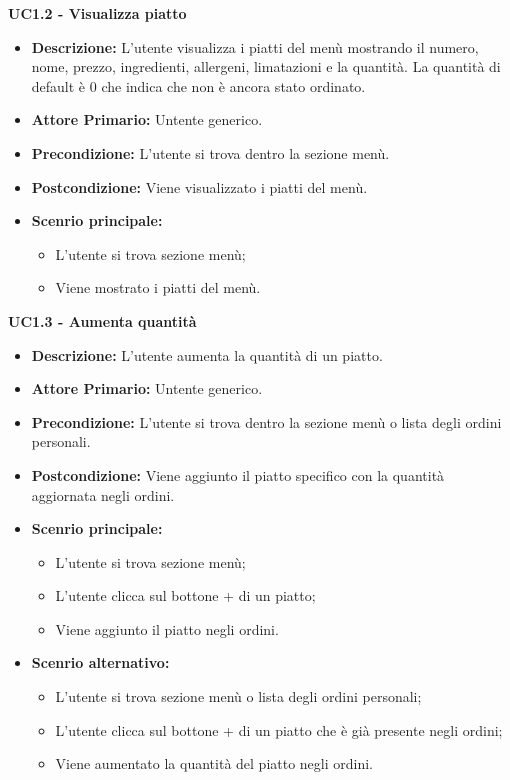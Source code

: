 \textbf{UC1.2 - Visualizza piatto}
\begin{itemize}
    \item \textbf{Descrizione:} L'utente visualizza i piatti del menù mostrando il numero, nome, prezzo, ingredienti, allergeni, limatazioni e la quantità. La quantità di default è 0 che indica che non è ancora stato ordinato.
    \item \textbf{Attore Primario:} Untente generico.
    \item \textbf{Precondizione:} L'utente si trova dentro la sezione menù.
    \item \textbf{Postcondizione:} Viene visualizzato i piatti del menù.
    \item \textbf{Scenrio principale:}  
    \begin{itemize}
        \item L'utente si trova sezione menù;
        \item Viene mostrato i piatti del menù.
    \end{itemize}
\end{itemize}
\textbf{UC1.3 - Aumenta quantità}
\begin{itemize}
    \item \textbf{Descrizione:} L'utente aumenta la quantità di un piatto.
    \item \textbf{Attore Primario:} Untente generico.
    \item \textbf{Precondizione:} L'utente si trova dentro la sezione menù o lista degli ordini personali.
    \item \textbf{Postcondizione:} Viene aggiunto il piatto specifico con la quantità aggiornata negli ordini.
    \item \textbf{Scenrio principale:}
    \begin{itemize}
        \item L'utente si trova sezione menù;
        \item L'utente clicca sul bottone + di un piatto;
        \item Viene aggiunto il piatto negli ordini.
    \end{itemize}
    \item \textbf{Scenrio alternativo:}
    \begin{itemize}
        \item L'utente si trova sezione menù o lista degli ordini personali;
        \item L'utente clicca sul bottone + di un piatto che è già presente negli ordini;
        \item Viene aumentato la quantità del piatto negli ordini.
    \end{itemize}
\end{itemize}
